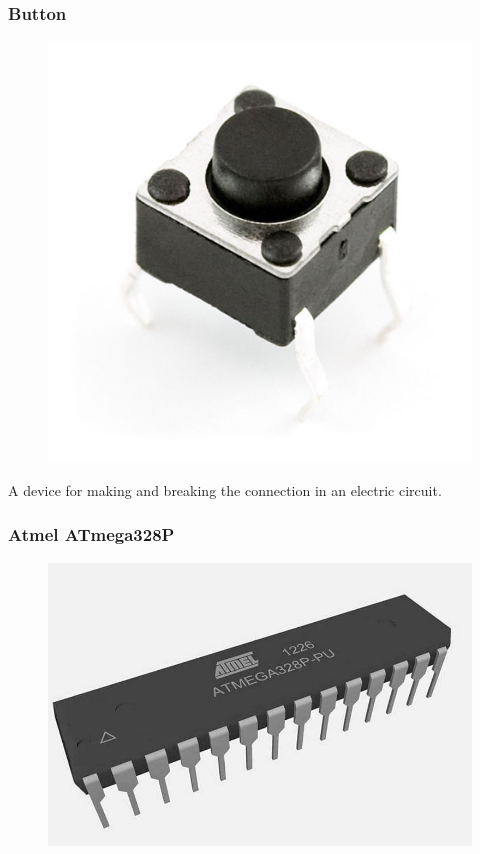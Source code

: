 \begin{frame}
	\frametitle{Button}
	\begin{figure}
   		\includegraphics[scale=.2]{assets/butt} 
	\end{figure}
	A device for making and breaking the connection in an electric circuit.
\end{frame}




\begin{frame}
	\frametitle{Atmel ATmega328P}
	\begin{figure}
		\includegraphics[scale=.3]{assets/atmega328p}  
	\end{figure}
\end{frame}


